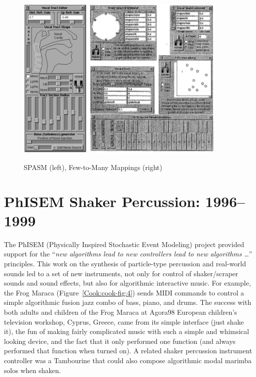 \begin{figure}[t]
\centering
\includegraphics[height=80mm]{img-3-eps-converted-to-crop.pdf}           
\includegraphics[height=80mm]{img-4-eps-converted-to-crop.pdf}
\caption{SPASM (left), Few-to-Many Mappings (right)}
\label{Cook:cook-fig:3}       %
\end{figure}



\section{PhISEM Shaker Percussion: 1996--1999}

The PhISEM (Physically Inspired Stochastic Event Modeling) project \cite{Cook:1996,Cook:1997} provided support for the ``\textit{new algorithms lead to new controllers lead to new algorithms \ldots{}}'' principles.  This work on the synthesis of particle-type percussion and real-world sounds led to a set of new instruments, not only for control of shaker/scraper sounds and sound effects, but also for algorithmic interactive music.  For example, the Frog Maraca (Figure~\ref{Cook:cook-fig:4}) sends MIDI commands to control a simple algorithmic fusion jazz combo of bass, piano, and drums.  The success with both adults and children of the Frog Maraca at Agora98 European children’s television workshop, Cyprus, Greece, came from its simple interface (just shake it), the fun of making fairly complicated music with such a simple and whimsical looking device, and the fact that it only performed one function (and always performed that function when turned on).  A related shaker percussion instrument controller was a Tambourine that could also compose algorithmic modal marimba solos when shaken.

